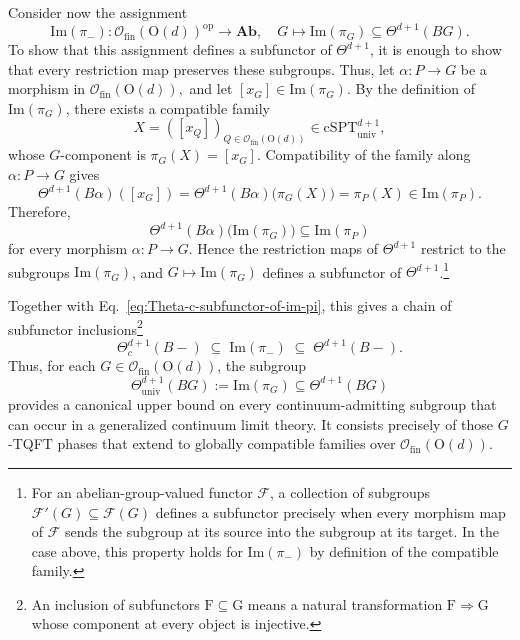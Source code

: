 \documentclass[aps,prx,reprint,superscriptaddress,twocolumn,amsmath,amssymb,amsfonts, nofootinbib]{revtex4-2}
\newcommand{\ofin}{\mathcal{O}_{\text{fin}}}
\theoremstyle{apsstyle}
\begin{document}
Consider now the assignment
\begin{equation*}
    \mathrm{Im}(\pi_-): \ofin(\mathrm{O}(d))^{\mathrm{op}}
    \longrightarrow \mathbf{Ab}, \quad G\mapsto
    \mathrm{Im}(\pi_G) \subseteq \Theta^{d+1}(BG).
\end{equation*}
To show that this assignment defines a subfunctor of $\Theta^{d+1}$, it is enough to show that every restriction map preserves these subgroups. Thus, let $\alpha:P\to G$ be a morphism in $\ofin(\mathrm{O}(d)),$ and let $[x_G]\in\mathrm{Im}(\pi_G)$. By the definition of $\mathrm{Im}(\pi_G)$, there exists a compatible family
\begin{equation*}
X=\left([x_Q]\right)_{Q\in\ofin(\mathrm{O}(d))}
\in \mathrm{cSPT}^{d+1}_{\mathrm{univ}},
\end{equation*}
whose $G$-component is $\pi_G(X)=[x_G]$. Compatibility of the family along $\alpha:P\to G$ gives
\begin{equation*}
\Theta^{d+1}(B\alpha)([x_G]) = \Theta^{d+1}(B\alpha)\bigl(\pi_G(X)\bigr)
= \pi_P(X) \in \mathrm{Im}(\pi_P).
\end{equation*}
Therefore,
\begin{equation*}
\Theta^{d+1}(B\alpha) \bigl(\mathrm{Im}(\pi_G)\bigr) \subseteq \mathrm{Im}(\pi_P)
\end{equation*}
for every morphism $\alpha:P\to G$. Hence the restriction maps of $\Theta^{d+1}$ restrict to the subgroups $\mathrm{Im}(\pi_G)$, and $G\mapsto\mathrm{Im}(\pi_G)$ defines a subfunctor of $\Theta^{d+1}$.\footnote{For an abelian-group-valued functor $\mathcal F$, a collection of subgroups $\mathcal F'(G)\subseteq\mathcal F(G)$ defines a subfunctor precisely when every morphism map of $\mathcal F$ sends the subgroup at its source into the subgroup at its target. In the case above, this property holds for $\mathrm{Im}(\pi_{-})$ by definition of the compatible family.}

Together with Eq.~\eqref{eq:Theta-c-subfunctor-of-im-pi}, this gives a chain of subfunctor inclusions\footnote{An inclusion of subfunctors $\mathrm{F}\subseteq\mathrm{G}$ means a natural transformation $\mathrm{F}\Rightarrow\mathrm{G}$ whose component at every object is injective.}
\begin{equation}
    \Theta_{c}^{d+1}(B-) \;\subseteq\;
    \mathrm{Im}(\pi_-)
    \;\subseteq\; \Theta^{d+1}(B-).
    \label{eq:Theta-c-subfunctor}
\end{equation}
Thus, for each $G\in\ofin(\mathrm{O}(d))$, the subgroup
\begin{equation}
    \Theta^{d+1}_{\mathrm{univ}}(BG)
    :=
    \mathrm{Im}(\pi_G)
    \subseteq
    \Theta^{d+1}(BG)
    \label{eq:universal-Theta-c1}
\end{equation}
provides a canonical upper bound on every continuum-admitting subgroup that can occur in a generalized continuum limit theory. It consists precisely of those $G$-TQFT phases that extend to globally compatible families over $\ofin(\mathrm{O}(d))$.
\end{document}
